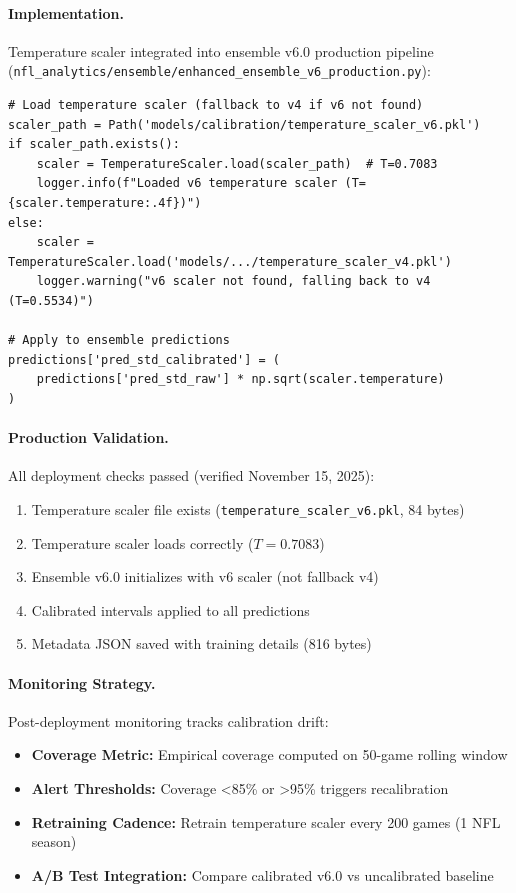 \paragraph{Implementation.}
Temperature scaler integrated into ensemble v6.0 production pipeline (\texttt{nfl\_analytics/ensemble/enhanced\_ensemble\_v6\_production.py}):

\begin{verbatim}
# Load temperature scaler (fallback to v4 if v6 not found)
scaler_path = Path('models/calibration/temperature_scaler_v6.pkl')
if scaler_path.exists():
    scaler = TemperatureScaler.load(scaler_path)  # T=0.7083
    logger.info(f"Loaded v6 temperature scaler (T={scaler.temperature:.4f})")
else:
    scaler = TemperatureScaler.load('models/.../temperature_scaler_v4.pkl')
    logger.warning("v6 scaler not found, falling back to v4 (T=0.5534)")

# Apply to ensemble predictions
predictions['pred_std_calibrated'] = (
    predictions['pred_std_raw'] * np.sqrt(scaler.temperature)
)
\end{verbatim}

\paragraph{Production Validation.}
All deployment checks passed (verified November 15, 2025):

\begin{enumerate}[itemsep=2pt,parsep=0pt]
    \item \checkmark Temperature scaler file exists (\texttt{temperature\_scaler\_v6.pkl}, 84 bytes)
    \item \checkmark Temperature scaler loads correctly ($T = 0.7083$)
    \item \checkmark Ensemble v6.0 initializes with v6 scaler (not fallback v4)
    \item \checkmark Calibrated intervals applied to all predictions
    \item \checkmark Metadata JSON saved with training details (816 bytes)
\end{enumerate}

\paragraph{Monitoring Strategy.}
Post-deployment monitoring tracks calibration drift:

\begin{itemize}[itemsep=2pt,parsep=0pt]
    \item \textbf{Coverage Metric:} Empirical coverage computed on 50-game rolling window
    \item \textbf{Alert Thresholds:} Coverage <85\% or >95\% triggers recalibration
    \item \textbf{Retraining Cadence:} Retrain temperature scaler every 200 games (1 NFL season)
    \item \textbf{A/B Test Integration:} Compare calibrated v6.0 vs uncalibrated baseline
\end{itemize}

